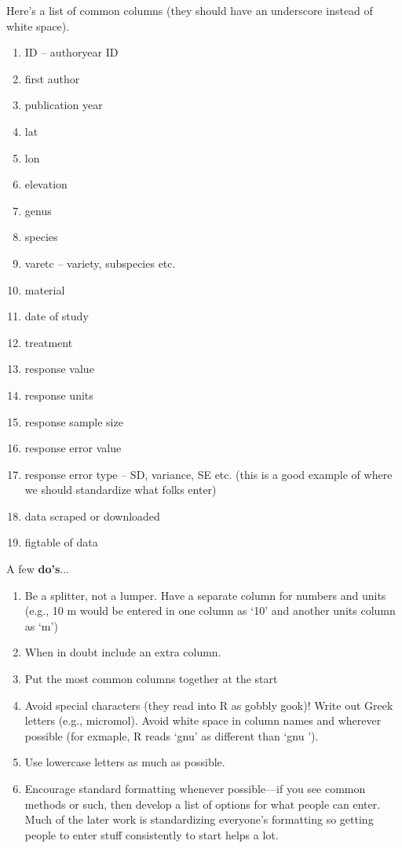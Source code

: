 \documentclass{article}[11pt]
\begin{document}
Here's a list of common columns (they should have an underscore instead of white space).
\begin{enumerate}
\item ID -- authoryear ID
\item first author
\item publication year
\item lat
\item lon
\item elevation
\item genus
\item species
\item varetc -- variety, subspecies etc.
\item material 
\item date of study
\item treatment
\item response value
\item response units
\item response sample size
\item response error value 
\item response error type -- SD, variance, SE etc. (this is a good example of where we should standardize what folks enter)
\item data scraped or downloaded
\item figtable of data
\end{enumerate}

A few {\bf do's}...
\begin{enumerate}
\item Be a splitter, not a lumper. Have a separate column for numbers and units (e.g., 10 m would be entered in one column as `10' and another units column as `m')
\item When in doubt include an extra column.
\item Put the most common columns together at the start
\item Avoid special characters (they read into R as gobbly gook)! Write out Greek letters (e.g., micromol). Avoid white space in column names and wherever possible (for exmaple, R reads `gnu' as different than `gnu '). 
\item Use lowercase letters as much as possible.
\item Encourage standard formatting whenever possible---if you see common methods or such, then develop a list of options for what people can enter. Much of the later work is standardizing everyone's formatting so getting people to enter stuff consistently to start helps a lot. 
\end{enumerate}
\end{document}
